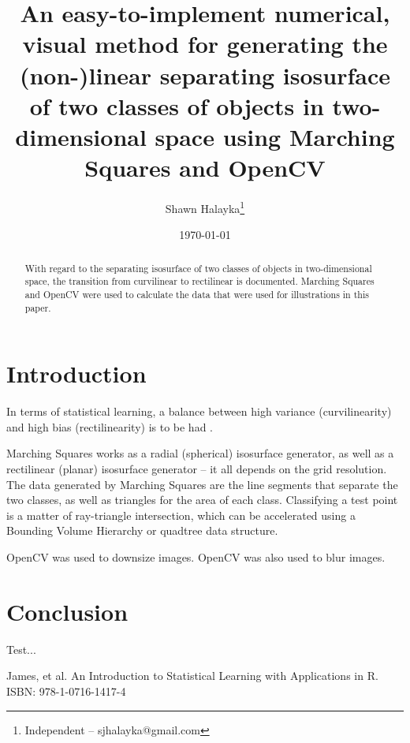 \documentclass[12pt]{article}
\title{An easy-to-implement numerical, visual method for generating the (non-)linear separating isosurface of two classes of objects in two-dimensional space using Marching Squares and OpenCV}
\author{
Shawn Halayka\footnote{Independent -- sjhalayka@gmail.com}
}
\date{\today\;\currenttime}
\begin{document}
\maketitle

\begin{abstract}
With regard to the separating isosurface of two classes of objects in two-dimensional space, the transition from curvilinear to rectilinear is documented.
Marching Squares and OpenCV were used to calculate the data that were used for illustrations in this paper.
\end{abstract}




\section{Introduction}

In terms of statistical learning, a balance between high variance (curvilinearity) and high bias (rectilinearity) is to be had \cite{james}.

Marching Squares works as a radial (spherical) isosurface generator, as well as a rectilinear (planar) isosurface generator -- it all depends on the grid resolution.
The data generated by Marching Squares are the line segments that separate the two classes, as well as triangles for the area of each class.
Classifying a test point is a matter of ray-triangle intersection, which can be accelerated using a Bounding Volume Hierarchy or quadtree data structure.

OpenCV was used to downsize images.
OpenCV was also used to blur images.


\section{Conclusion}

Test...



\pagebreak


\begin{thebibliography}{9}

 James, et al. An Introduction to Statistical Learning with Applications in R. ISBN: 978-1-0716-1417-4

\end{thebibliography}



\pagebreak
\end{document}
